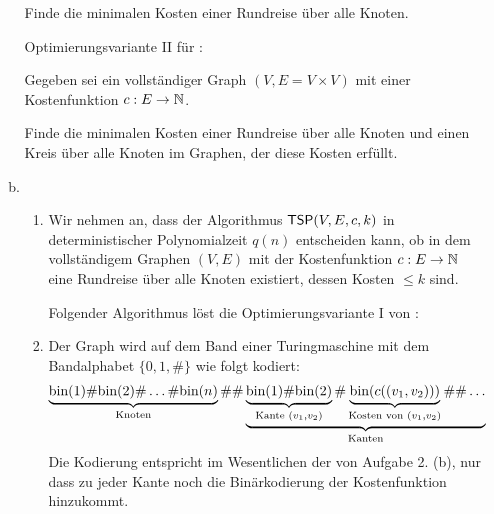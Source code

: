 \begin{enumerate}
\begin{enumerate}[(a)]
        Finde die minimalen Kosten einer Rundreise über alle Knoten.

      Optimierungsvariante II für \TSP{}:

        Gegeben sei ein vollständiger Graph $(V, E = V \times V)$ mit
        einer Kostenfunktion $c: E \rightarrow \mathbb{N}$.

        Finde die minimalen Kosten einer Rundreise über alle Knoten und einen
        Kreis über alle Knoten im Graphen, der diese Kosten erfüllt.

      \item
        \begin{enumerate}[1.]
          \item Wir nehmen an, dass der Algorithmus $\textsf{TSP}(V, E, c, k)$ in
            deterministischer Polynomialzeit $q(n)$ entscheiden kann, ob in dem
            vollständigem Graphen $(V, E)$ mit der Kostenfunktion
            $c: E \rightarrow \mathbb{N}$ eine Rundreise über alle Knoten existiert,
            dessen Kosten $\leq k$ sind.

            Folgender Algorithmus löst die Optimierungsvariante I von \TSP{}:
            \begin{algorithmic}[1]
                \ELSE{}
                \ENDIF{}
              \ENDWHILE{}
            \end{algorithmic}

          \item Der Graph wird auf dem Band einer Turingmaschine mit dem
            Bandalphabet $\{0, 1, \#\}$ wie folgt kodiert:
            \begin{align*}
              \underbrace{\bin(1) \# \bin(2) \# \ldots \# \bin(n)}_{\text{Knoten}}
              \# \#
              \underbrace{%
                \underbrace{\bin(1) \# \bin(2)}_{\text{Kante\ } (v_1, v_2)}
                \#
                \underbrace{\bin(c((v_1, v_2)))}_{\text{Kosten von } (v_1, v_2)}
                \# \# \ldots
              }_{\text{Kanten}}
            \end{align*}
            Die Kodierung entspricht im Wesentlichen der von Aufgabe 2. (b), nur
            dass zu jeder Kante noch die Binärkodierung der Kostenfunktion
            hinzukommt.


\end{enumerate}
\end{enumerate}
\end{enumerate}
